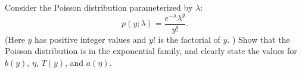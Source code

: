 \item {} Consider the Poisson distribution parameterized by $\lambda$:
%
\begin{equation*}
  p(y; \lambda) = \frac{e^{-\lambda}\lambda^y}{y!}.
\end{equation*}
%
(Here $y$ has positive integer values and $y!$ is the factorial of $y$. ) Show that the Poisson distribution is in the exponential family, and clearly state the values for $b(y)$, $\eta$, $T(y)$, and $a(\eta)$.\\

